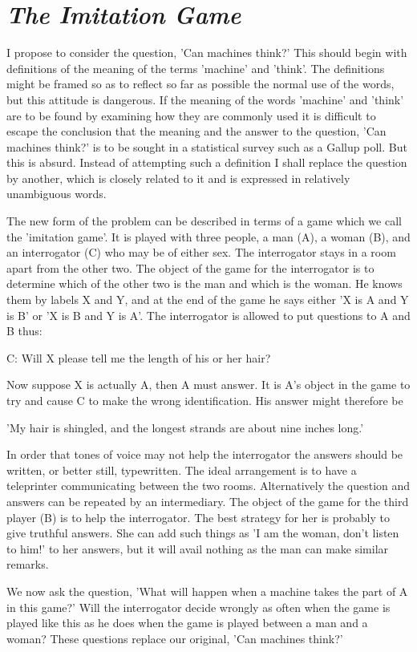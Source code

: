     \section{\textit{The Imitation Game}}
    
    I propose to consider the question, 'Can machines think?' This should begin with definitions of the meaning of the terms 'machine' and 'think'. The definitions might be framed so as to reflect so far as possible the normal use of the words, but this attitude is dangerous. If the meaning of the words 'machine' and 'think' are to be found by examining how they are commonly used it is difficult to escape the conclusion that the meaning and the answer to the question, 'Can machines think?' is to be sought in a statistical survey such as a Gallup poll. But this is absurd. Instead of attempting such a definition I shall replace the question by another, which is closely related to it and is expressed in relatively unambiguous words.

    The new form of the problem can be described in terms of a game which we call the 'imitation game'. It is played with three people, a man (A), a woman (B), and an interrogator (C) who may be of either sex. The interrogator stays in a room apart from the other two. The object of the game for the interrogator is to determine which of the other two is the man and which is the woman. He knows them by labels X and Y, and at the end of the game he says either 'X is A and Y is B' or 'X is B and Y is A'. The interrogator is allowed to put questions to A and B thus:

    C: Will X please tell me the length of his or her hair?

    \noindent
    Now suppose X is actually A, then A must answer. It is A's object in the game to try and cause C to make the wrong identification. His answer might therefore be

    'My hair is shingled, and the longest strands are about nine inches long.'

    In order that tones of voice may not help the interrogator the answers should be written, or better still, typewritten. The ideal arrangement is to have a teleprinter communicating between the two rooms. Alternatively the question and answers can be repeated by an intermediary. The object of the game for the third player (B) is to help the interrogator. The best strategy for her is probably to give truthful answers. She can add such things as 'I am the woman, don't listen to him!' to her answers, but it will avail nothing as the man can make similar remarks.

    We now ask the question, 'What will happen when a machine takes the part of A in this game?' Will the interrogator decide wrongly as often when the game is played like this as he does when the game is played between a man and a woman? These questions replace our original, 'Can machines think?'